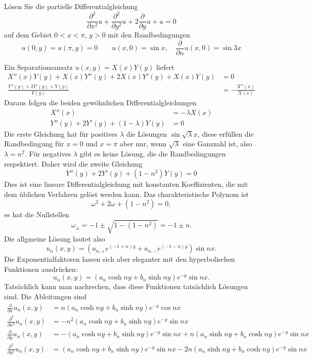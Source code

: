 Lösen Sie die partielle Differentialgleichung
\[
\frac{\partial^2}{\partial x^2}u+\frac{\partial^2}{\partial y^2}u
+2\frac{\partial }{\partial y}u+u=0
\]
auf dem Gebiet $0 < x < \pi$, $y > 0$ mit den Randbedingungen
\[
u(0,y)=u(\pi,y)=0
\quad
\quad
u(x,0)=\sin x,\quad \frac{\partial }{\partial n}u(x,0)=\sin 3x
\]

\begin{loesung}
Ein Separationsansatz $u(x,y)=X(x)Y(y)$ liefert
\begin{align*}
X''(x)Y(y)+X(x)Y''(y)+2X(x)Y'(y)+X(x)Y(y)&=0
\\
\frac{Y''(y)+2Y'(y)+Y(y)}{Y(y)}
&=
-\frac{X''(x)}{X(x)}
\end{align*}
Daraus folgen die beiden gewöhnlichen Differentialgleichungen
\begin{align*}
X''(x)&=-\lambda X(x)\\
Y''(y)+2Y'(y)+(1-\lambda)Y(y)&=0
\end{align*}
Die erste Gleichung hat für positives $\lambda$ die Lösungen
$\sin\sqrt{\lambda}x$, diese erfüllen die Randbedingung für $x=0$
und $x=\pi$ aber nur, wenn $\sqrt{\lambda}$ eine Ganzzahl ist, also
$\lambda=n^2$. Für negatives $\lambda$ gibt es keine Lösung,
die die Randbedingungen respektiert. Daher wird die zweite Gleichung
\[
Y''(y)+2Y'(y)+(1-n^2)Y(y)=0
\]
Dies ist eine lineare Differentialgleichung mit konstanten
Koeffizienten, die mit dem üblichen Verfahren gelöst werden
kann. Das charakteristische Polynom ist
\[
\omega^2+2\omega+(1-n^2)=0,
\]
es hat die Nullstellen
\[
\omega_{\pm}=-1\pm{\sqrt{1-(1-n^2)}}=-1\pm n.
\]
Die allgmeine Lösung lautet also
\[
u_n(x,y)=(a_{n,+}e^{(-1+n)y}+a_{n,-}e^{(-1-n)y})\sin nx.
\]
Die Exponentialfaktoren lassen sich aber eleganter
mit den hyperbolischen Funktionen ausdrücken:
\[
u_n(x,y)=(a_n\cosh ny+b_n\sinh ny)e^{-y}\sin nx.
\]
Tatsächlich kann man nachrechen, dass diese Funktionen
tatsächlich Lösungen sind. Die Ableitungen sind
\begin{align*}
\frac{\partial}{\partial x}u_n(x,y)
&=
n (a_n\cosh ny+b_n\sinh ny)e^{-y}\cos nx
\\
\frac{\partial^2}{\partial x^2}u_n(x,y)
&=
-n^2 (a_n\cosh ny+b_n\sinh ny)e^{-y}\sin nx
\\
\frac{\partial}{\partial y}u_n(x,y)
&=
-(a_n\cosh ny+b_n\sinh ny)e^{-y}\sin nx
+
n(a_n\sinh ny+b_n\cosh ny)e^{-y}\sin nx
\\
\frac{\partial^2}{\partial y^2}u_n(x,y)
&=
(a_n\cosh ny+b_n\sinh ny)e^{-y}\sin nx
-2n(a_n\sinh ny+b_n\cosh ny)e^{-y}\sin nx
\\
&\qquad

\end{align*}
\end{loesung}
